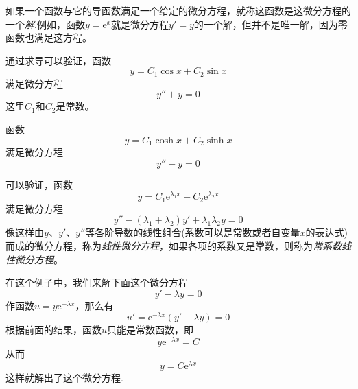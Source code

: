 如果一个函数与它的导函数满足一个给定的微分方程，就称这函数是这微分方程的一个\emph{解}.例如，函数$y=\mathrm{e}^x$就是微分方程$y'=y$的一个解，但并不是唯一解，因为零函数也满足这方程。

\begin{example}
  通过求导可以验证，函数
  \[ y=C_1 \cos{x} + C_2 \sin{x} \]
  满足微分方程
  \[ y''+y=0 \]
  这里$C_1$和$C_2$是常数。
\end{example}

\begin{example}
  函数
  \[ y= C_1 \cosh{x} + C_2 \sinh{x} \]
  满足微分方程
  \[ y''-y=0 \]
\end{example}

\begin{example}
  可以验证，函数
  \[ y = C_1 \mathrm{e}^{\lambda_1 x} + C_2 \mathrm{e}^{\lambda_2 x} \]
  满足微分方程
  \[ y''-(\lambda_1+\lambda_2)y' + \lambda_1 \lambda_2 y = 0 \]
  像这样由$y$、$y'$、$y''$等各阶导数的线性组合(系数可以是常数或者自变量$x$的表达式)而成的微分方程，称为\emph{线性微分方程}，如果各项的系数又是常数，则称为\emph{常系数线性微分方程}。
\end{example}

\begin{example}
  在这个例子中，我们来解下面这个微分方程
  \[ y'-\lambda y = 0 \]
  作函数$u=y\mathrm{e}^{-\lambda x}$，那么有
  \[ u'=\mathrm{e}^{-\lambda x} (y'-\lambda y) = 0 \]
  根据前面的结果，函数$u$只能是常数函数，即
  \[ y\mathrm{e}^{-\lambda x} = C \]
  从而
  \[ y = C \mathrm{e}^{\lambda x} \]
  这样就解出了这个微分方程.
\end{example}




